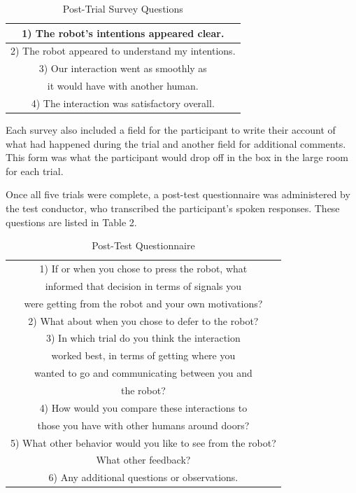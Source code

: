 \documentclass[letterpaper, 10 pt, conference]{ieeeconf}  %
\begin{document}
\begin{table}[h]
\caption{Post-Trial Survey Questions}
\label{survey_questions}
\begin{center}
\begin{tabular}{|c|}
\hline
1) The robot’s intentions appeared clear.\\
\hline
2) The robot appeared to understand my intentions.\\
\hline
3) Our interaction went as smoothly as \\
it would have with another human.\\
\hline
4) The interaction was satisfactory overall.\\
\hline
\end{tabular}
\end{center}
\end{table}

Each survey also included a field for the participant to write their account of what had happened during the trial and another field for additional comments. This form was what the participant would drop off in the box in the large room for each trial.

Once all five trials were complete, a post-test questionnaire was administered by the test conductor, who transcribed the participant’s spoken responses. These questions are listed in Table 2.

\begin{table}[h]
\caption{Post-Test Questionnaire}
\label{questionnaire_questions}
\begin{center}
\begin{tabular}{|c|}
\hline
1) If or when you chose to press the robot, what \\
informed that decision in terms of signals you \\
were getting from the robot and your own motivations?\\
\hline
2) What about when you chose to defer to the robot?\\
\hline
3) In which trial do you think the interaction \\
worked best, in terms of getting where you \\
wanted to go and communicating between you and \\
the robot?\\
\hline
4) How would you compare these interactions to \\
those you have with other humans around doors?\\
\hline
5) What other behavior would you like to see from the robot? \\
What other feedback?\\
\hline
6) Any additional questions or observations.\\
\hline
\end{tabular}
\end{center}
\end{table}
\end{document}
